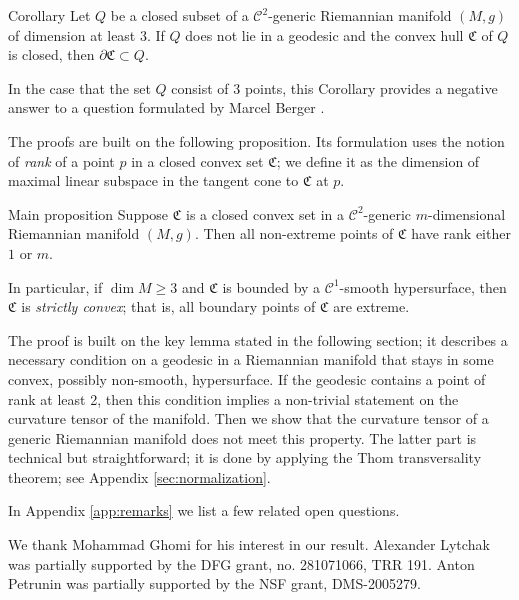 \documentclass[a4paper,10pt]{article}
\begin{document}
\begin{thm}{Corollary}\label{cor:caratheodory}
Let $Q$ be a closed subset of a $\mathcal C^2$-generic Riemannian manifold $(M,g)$ of dimension at least $3$. If $Q$ does not lie in a  geodesic and
the convex hull $\mathfrak C$ of $Q$ is closed, then $\partial \mathfrak C \subset Q$.
\end{thm}

In the case that the  set $Q$ consist of $3$ points, this Corollary provides a negative answer to a question formulated by Marcel Berger \cite[Note 6.1.3.1]{berger-2003}.

The proofs are built on the following proposition.
Its formulation uses the notion of \emph{rank} of a point $p$ in a closed convex set $\mathfrak{C}$;
we define it as the dimension of maximal linear subspace in the tangent cone to $\mathfrak{C}$ at $p$.

\begin{thm}{Main proposition}\label{prom:rank}
Suppose $\mathfrak{C}$ is a closed convex set in a $\mathcal C^2$-generic $m$-dimensional Riemannian manifold $(M,g)$.
Then all non-extreme points of $\mathfrak{C}$ have rank either $1$ or $m$.

In particular, if $\dim M\ge 3$ and $\mathfrak{C}$ is bounded by a $\mathcal{C}^1$-smooth hypersurface, then $\mathfrak{C}$ is \emph{strictly convex};
that is, all boundary points of $\mathfrak{C}$ are extreme.
\end{thm}


The proof is built on the key lemma stated in the following section;   
it describes a necessary condition on a geodesic in a Riemannian manifold that stays
in some convex, possibly non-smooth, hypersurface.
If the geodesic contains a point of rank at least 2, then this condition implies a non-trivial
statement on the curvature tensor of the manifold.
Then we show that the curvature tensor of a generic Riemannian manifold does not meet this property.
The latter part is technical but straightforward; it is done by applying the Thom transversality theorem; see Appendix \ref{sec:normalization}.

In Appendix \ref{app:remarks} we list a few related open questions.

We thank Mohammad Ghomi for his interest in our result.
Alexander Lytchak was partially supported by the DFG grant, no. 281071066, TRR 191.
Anton Petrunin was partially supported by the NSF grant, DMS-2005279.
\end{document}
